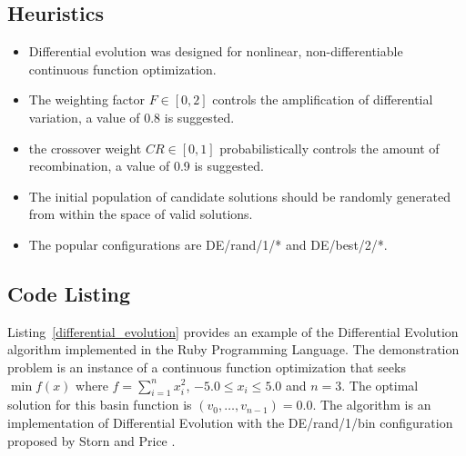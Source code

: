 \subsection{Heuristics}
\begin{itemize}
	\item Differential evolution was designed for nonlinear, non-differentiable continuous function optimization.
	\item The weighting factor $F \in [0,2]$ controls the amplification of differential variation, a value of 0.8 is suggested.
	\item the crossover weight $CR \in [0,1]$ probabilistically controls the amount of recombination, a value of 0.9 is suggested.
	\item The initial population of candidate solutions should be randomly generated from within the space of valid solutions.
	\item The popular configurations are DE/rand/1/* and DE/best/2/*. 
\end{itemize}

\subsection{Code Listing}
Listing~\ref{differential_evolution} provides an example of the Differential Evolution algorithm implemented in the Ruby Programming Language.
The demonstration problem is an instance of a continuous function optimization that seeks $\min f(x)$ where $f=\sum_{i=1}^n x_{i}^2$, $-5.0\leq x_i \leq 5.0$ and $n=3$. The optimal solution for this basin function is $(v_0,\ldots,v_{n-1})=0.0$.
The algorithm is an implementation of Differential Evolution with the DE/rand/1/bin configuration proposed by Storn and Price \cite{Storn1997}. \\ %


